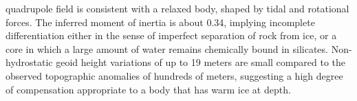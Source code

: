 \documentclass{article}
\begin{document}
                    \gls{quadrupole} field is consistent with
                    a  relaxed
                    body, shaped by tidal and rotational forces. The
                    inferred \gls{moment of inertia} is about 0.34,
                    implying incomplete differentiation either in
                    the sense of imperfect separation of rock from
                    ice, or a core in which a large amount of water
                    remains chemically bound in silicates.
                    Non-hydrostatic \gls{geoid}
                    height variations of up to 19 meters are
                    small compared to the observed topographic
                    anomalies of hundreds of meters, suggesting a
                    high degree of compensation appropriate to a
                    body that has warm ice at depth.
\end{document}
